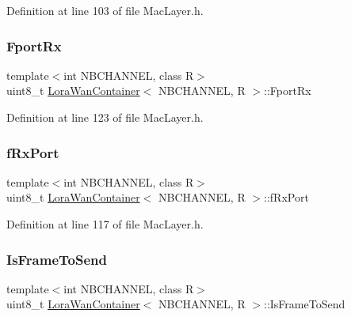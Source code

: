 Definition at line 103 of file Mac\+Layer.\+h.

\mbox{\label{class_lora_wan_container_a90fd2bfb7df32ce225e2860c920e58d6}} 
\subsubsection{\texorpdfstring{Fport\+Rx}{FportRx}}
{\footnotesize\ttfamily template$<$int N\+B\+C\+H\+A\+N\+N\+EL, class R$>$ \\
uint8\+\_\+t \mbox{\hyperlink{class_lora_wan_container}{Lora\+Wan\+Container}}$<$ N\+B\+C\+H\+A\+N\+N\+EL, R $>$\+::Fport\+Rx}



Definition at line 123 of file Mac\+Layer.\+h.

\mbox{\label{class_lora_wan_container_a2659e1c21772c4948ed6669e6b8c1773}} 
\subsubsection{\texorpdfstring{f\+Rx\+Port}{fRxPort}}
{\footnotesize\ttfamily template$<$int N\+B\+C\+H\+A\+N\+N\+EL, class R$>$ \\
uint8\+\_\+t \mbox{\hyperlink{class_lora_wan_container}{Lora\+Wan\+Container}}$<$ N\+B\+C\+H\+A\+N\+N\+EL, R $>$\+::f\+Rx\+Port}



Definition at line 117 of file Mac\+Layer.\+h.

\mbox{\label{class_lora_wan_container_af3427d177dc92611f2da1507c147d317}} 
\subsubsection{\texorpdfstring{Is\+Frame\+To\+Send}{IsFrameToSend}}
{\footnotesize\ttfamily template$<$int N\+B\+C\+H\+A\+N\+N\+EL, class R$>$ \\
uint8\+\_\+t \mbox{\hyperlink{class_lora_wan_container}{Lora\+Wan\+Container}}$<$ N\+B\+C\+H\+A\+N\+N\+EL, R $>$\+::Is\+Frame\+To\+Send}



